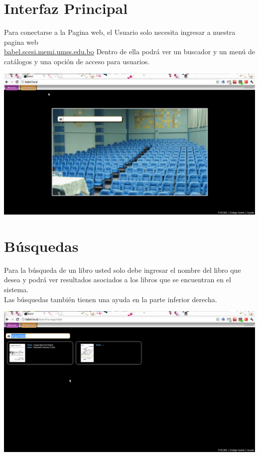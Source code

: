 \documentclass[12pt,letterpaper,oneside]{book}
\begin{document}
\section{Interfaz Principal}
Para conectarse a la Pagina web, el Usuario solo necesita ingresar a nuestra pagina web\\ \url{ babel.scesi.memi.umss.edu.bo} Dentro de ella podrá ver un buscador y un menú de catálogos y una opción de acceso para usuarios.
\begin{center}
\includegraphics[scale=0.36]{img/1.png}
\end{center}
\section{Búsquedas}
Para la búsqueda de un libro usted solo debe ingresar el nombre del libro que desea y podrá ver resultados asociados a los libros que se encuentran en el sistema.\\
Las búsquedas también tienen una ayuda en la parte inferior derecha.
\begin{center}
\includegraphics[scale=0.36]{img/2.png}
\end{center}
\end{document}
